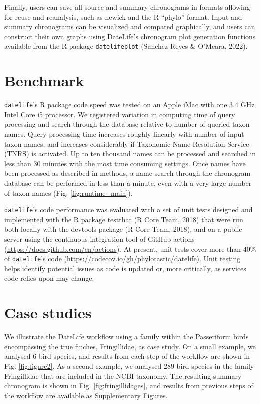 \documentclass[english,man]{apa6}
\begin{document}
Finally, users can save all source and summary chronograms in formats allowing for reuse and reanalysis, such as newick and the R \enquote{phylo} format. Input and summary chronograms can be visualized and compared graphically, and users can construct their own graphs using DateLife's chronogram plot generation functions available from the R package \texttt{datelifeplot} (Sanchez-Reyes \& O'Meara, 2022).

\hypertarget{benchmark}{%
\section{Benchmark}\label{benchmark}}

\texttt{datelife}'s R package code speed was tested on an Apple iMac
with one 3.4 GHz Intel Core i5 processor.
We registered variation in computing time of query processing and search through the database relative to number of queried taxon names.
Query processing time increases roughly linearly with number of input taxon names, and
increases considerably if Taxonomic Name Resolution Service (TNRS) is activated.
Up to ten thousand names can be processed and searched in less than 30 minutes with the most time consuming settings.
Once names have been processed as described in methods, a name search through the chronogram database can be performed in less than a minute, even with a very large number of taxon names (Fig. \ref{fig:runtime_main}).

\texttt{datelife}'s code performance was evaluated with a set of unit tests designed and
implemented with the R package testthat (R Core Team, 2018) that were run both locally
with the devtools package (R Core Team, 2018), and on a public server using the continuous integration tool of GitHub actions (\url{https://docs.github.com/en/actions}).
At present, unit tests cover more than 40\% of \texttt{datelife}'s code (\url{https://codecov.io/gh/phylotastic/datelife}).
Unit testing helps identify potential issues as code is updated or, more critically, as services code relies upon may change.

\hypertarget{case-studies}{%
\section{Case studies}\label{case-studies}}

We illustrate the DateLife workflow using a family within the Passeriform birds encompassing the true finches, Fringillidae, as case study. On a small example, we analysed 6 bird species, and results from each step of the workflow are shown in Fig. \ref{fig:figure2}. As a second example, we analysed 289 bird species in the family Fringillidae that are included in the NCBI taxonomy. The resulting summary chronogram is shown in Fig. \ref{fig:fringillidages}, and results from previous steps of the workflow are available as Supplementary Figures.
\end{document}
